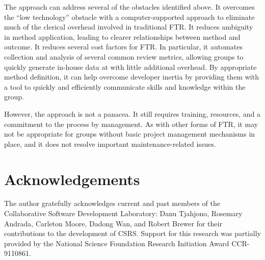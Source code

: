The approach can address several of the obstacles identified above.  It 
overcomes the ``low technology'' obstacle with a computer-supported
approach to eliminate much of the clerical overhead involved in traditional
FTR.  It reduces ambiguity in method application, leading to clearer
relationships between method and outcome.  It reduces several cost factors
for FTR.  In particular, it automates collection and analysis of several
common review metrics, allowing groups to quickly generate in-house data at
with little additional overhead.  By appropriate method definition, it can
help overcome developer inertia by providing them with a tool to quickly
and efficiently communicate skills and knowledge within the group. 

However, the approach is not a panacea. It still requires training,
resources, and a commitment to the process by management.  As with
other forms of FTR, it may not be appropriate for groups without basic
project management mechanisms in place, and it does not resolve
important maintenance-related issues. 

\section{Acknowledgements}

{\small 
The author gratefully acknowledges current and past members of the
Collaborative Software Development Laboratory: Danu Tjahjono, Rosemary
Andrada, Carleton Moore, Dadong Wan, and Robert Brewer for their
contributions to the development of CSRS. Support for this research was
partially provided by the National Science Foundation Research Initiation
Award CCR-9110861.
}











